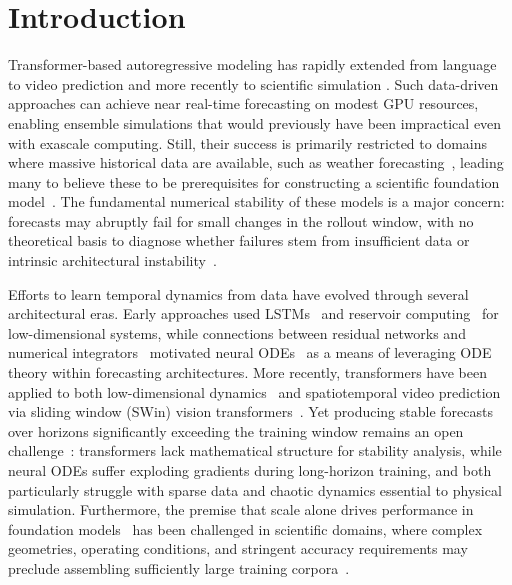 \documentclass[12pt]{article}
\begin{document}
\section{Introduction}

Transformer-based autoregressive modeling has rapidly extended from language \cite{AIAYN} to video prediction \cite{dosovitskiy2021image} and more recently to scientific simulation \cite{brandstetter2022message,herde2024poseidon,mccabe2024multiple,subramanian2024towards}. Such data-driven approaches can achieve near real-time forecasting on modest GPU resources, enabling ensemble simulations that would previously have been impractical even with exascale computing. Still, their success is primarily restricted to domains where massive historical data are available, such as weather forecasting~\cite{lam2023learning,bodnar2025aurora}, leading many to believe these to be prerequisites for constructing a scientific foundation model~\cite{carter2023advanced,choi2025defining,subramanian2024towards}. The fundamental numerical stability of these models is a major concern: forecasts may abruptly fail for small changes in the rollout window, with no theoretical basis to diagnose whether failures stem from insufficient data or intrinsic architectural instability~\cite{lippe2023pde}.

Efforts to learn temporal dynamics from data have evolved through several architectural eras. Early approaches used LSTMs~\cite{vlachas2018data} and reservoir computing~\cite{pathak2018model} for low-dimensional systems, while connections between residual networks and numerical integrators~\cite{haber2018stable,weinan2017proposal} motivated neural ODEs~\cite{chen2018neural} as a means of leveraging ODE theory within forecasting architectures. More recently, transformers have been applied to both low-dimensional dynamics~\cite{geneva2022transformers} and spatiotemporal video prediction via sliding window (SWin) vision transformers~\cite{YanZhangAbbeelSrinivas21,Liu_2021_ICCV}. Yet producing stable forecasts over horizons significantly exceeding the training window remains an open challenge~\cite{kim2025comprehensive,lippe2023pde}: transformers lack mathematical structure for stability analysis, while neural ODEs suffer exploding gradients during long-horizon training, and both particularly struggle with sparse data and chaotic dynamics essential to physical simulation. Furthermore, the premise that scale alone drives performance in foundation models~\cite{bommasani2021opportunities} has been challenged in scientific domains, where complex geometries, operating conditions, and stringent accuracy requirements may preclude assembling sufficiently large training corpora~\cite{nasem2025foundation,choi2025defining}.
\end{document}
